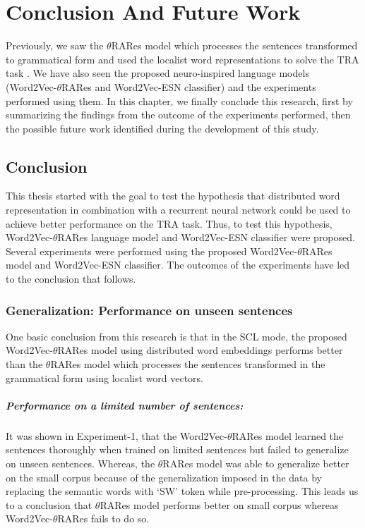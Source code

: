 \chapter{Conclusion And Future Work}\label{conclusion}

Previously, we saw the $\theta$RARes model which processes the sentences transformed to grammatical form and used the localist word representations to solve the TRA task \cite{xavier:2013:RT}. We have also seen the proposed neuro-inspired language models (Word2Vec-$\theta$RARes and Word2Vec-ESN classifier) and the experiments performed using them. In this chapter, we finally conclude this research, first by summarizing the findings from the outcome of the experiments performed, then the possible future work identified during the development of this study.

\section{Conclusion}

This thesis started with the goal to test the hypothesis that distributed word representation in combination with a recurrent neural network could be used to achieve better performance on the TRA task. Thus, to test this hypothesis, Word2Vec-$\theta$RARes language model and Word2Vec-ESN classifier were proposed. Several experiments were performed using the proposed Word2Vec-$\theta$RARes model and Word2Vec-ESN classifier. The outcomes of the experiments have led to the conclusion that follows.

\subsection{Generalization: Performance on unseen sentences}

One basic conclusion from this research is that in the SCL mode, the proposed Word2Vec-$\theta$RARes model using distributed word embeddings performs better than the $\theta$RARes model which processes the sentences transformed in the grammatical form using localist word vectors.

\paragraph{Performance on a limited number of sentences:} It was shown in Experiment-1, that the Word2Vec-$\theta$RARes model learned the sentences thoroughly when trained on limited sentences but failed to generalize on unseen sentences. Whereas, the  $\theta$RARes model was able to generalize better on the small corpus because of the generalization imposed in the data by replacing the semantic words with `SW' token while pre-processing. This leads us to a conclusion that $\theta$RARes model performs better on small corpus whereas Word2Vec-$\theta$RARes fails to do so. 

